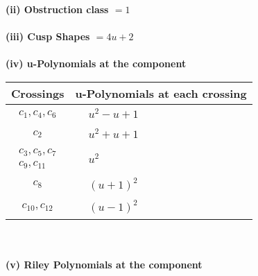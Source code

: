 \documentclass[1p]{elsarticle_modified}
\theoremstyle{definition}
\begin{document}
\flushleft \textbf{(ii) Obstruction class $= 1$}\\~\\
\flushleft \textbf{(iii) Cusp Shapes $= 4 u+2$}\\~\\
\newpage\renewcommand{\arraystretch}{1}
\flushleft \textbf{(iv) u-Polynomials at the component}\newline \\
\begin{tabular}{m{50pt}|m{274pt}}
Crossings & \hspace{64pt}u-Polynomials at each crossing \\
\hline $$\begin{aligned}c_{1},c_{4},c_{6}\end{aligned}$$&$\begin{aligned}
&u^2- u+1
\end{aligned}$\\
\hline $$\begin{aligned}c_{2}\end{aligned}$$&$\begin{aligned}
&u^2+u+1
\end{aligned}$\\
\hline $$\begin{aligned}c_{3},c_{5},c_{7}\\c_{9},c_{11}\end{aligned}$$&$\begin{aligned}
&u^2
\end{aligned}$\\
\hline $$\begin{aligned}c_{8}\end{aligned}$$&$\begin{aligned}
&(u+1)^2
\end{aligned}$\\
\hline $$\begin{aligned}c_{10},c_{12}\end{aligned}$$&$\begin{aligned}
&(u-1)^2
\end{aligned}$\\
\hline
\end{tabular}\\~\\
\newpage\renewcommand{\arraystretch}{1}
\flushleft \textbf{(v) Riley Polynomials at the component}\newline \\
\end{document}
